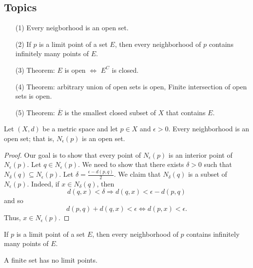 \documentclass[a4paper]{report}
\begin{document}
\subsection{Topics}

\begin{enumerate}
    \item[(1)] Every neigborhood is an open set.
    \item[(2)] If \( p  \) is a limit point of a set \( E  \), then every neighborhood of \( p  \) contains infinitely many points of \( E  \). 
    \item[(3)] Theorem: \( E  \) is open \( \Longleftrightarrow \) \( E^{C}   \) is closed.
    \item[(4)] Theorem: arbitrary union of open sets is open, Finite intersection of open sets is open.
    \item[(5)] Theorem: \( \overline{E} \) is the smallest closed subset of \( X  \) that contains \( E  \).
\end{enumerate}

\begin{theorem}[ ]
   Let \( (X,d) \) be a metric space and let \( p \in X  \) and \( \epsilon > 0  \). Every neighborhood is an open set; that is, \( {N}_{\epsilon}(p) \) is an open set.
\end{theorem}

\begin{proof}
Our goal is to show that every point of \( {N}_{\epsilon}(p) \) is an interior point of \( {N}_{\epsilon}(p) \). Let \( q \in {N}_{\epsilon}(p) \). We need to show that there exists \( \delta > 0  \) such that \( {N}_{\delta}(q) \subseteq {N}_{\epsilon}(p) \). Let \( \delta = \frac{ \epsilon - d(p,q)  }{ 2 }  \). We claim that \( {N}_{\delta}(q) \) is a subset of \( {N}_{\epsilon}(p) \). Indeed, if \( x \in {N}_{\delta}(q) \), then  
\[  d(q,x) < \delta \Longrightarrow d(q,x) < \epsilon - d(p,q)  \]
and so
\[  d(p,q) + d(q,x) < \epsilon \Longleftrightarrow d(p,x) < \epsilon \tag{triangle inequality}. \]
Thus, \( x \in {N}_{\epsilon}(p) \).

\end{proof}

\begin{theorem}[ ]
   If \( p  \) is a limit point of a set \( E  \), then every neighborhood of \( p  \) contains infinitely many points of \( E  \).
\end{theorem}

\begin{corollary}
    A finite set has no limit points.
\end{corollary}

\begin{theorem}[ ]
    
\end{theorem}

\begin{theorem}[ ]
    
\end{theorem}

\begin{theorem}[ ]
    
\end{theorem}
\end{document}
